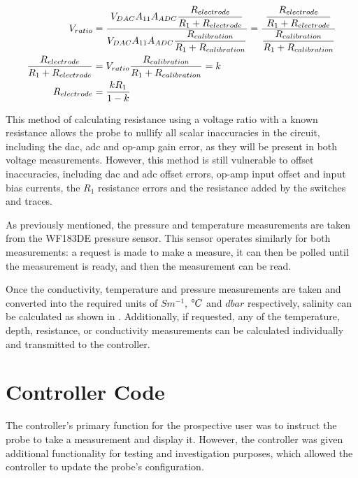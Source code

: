 \begin{align}
 V_{ratio} &= \frac{\displaystyle V_{DAC}A_{11}A_{ADC}\frac{\displaystyle R_{electrode}}{\displaystyle R_1 + R_{electrode}}}{\displaystyle V_{DAC}A_{11}A_{ADC}\frac{\displaystyle R_{calibration}}{\displaystyle R_1 + R_{calibration}}} = \frac{\displaystyle\frac{\displaystyle R_{electrode}}{\displaystyle R_1 + R_{electrode}}}{\displaystyle\frac{\displaystyle R_{calibration}}{\displaystyle R_1 + R_{calibration}}} \label{eqn:electrode-calib-resistance} \\
 \frac{\displaystyle R_{electrode}}{\displaystyle R_1 + R_{electrode}} &= V_{ratio} \frac{\displaystyle R_{calibration}}{\displaystyle R_1 + R_{calibration}} = k \label{eqn:electrode-calib-resistance-simplified} \\
 R_{electrode} &= \frac{\displaystyle kR_1}{\displaystyle1 - k} \label{eqn:electrode-calib-resistance-final}
\end{align}

This method of calculating resistance using a voltage ratio with a known resistance allows the probe to nullify all scalar inaccuracies in the circuit, including the \gls{dac}, \gls{adc} and op-amp gain error, as they will be present in both voltage measurements.
However, this method is still vulnerable to offset inaccuracies, including \gls{dac} and \gls{adc} offset errors, op-amp input offset and input bias currents, the $R_1$ resistance errors and the resistance added by the switches and traces.

As previously mentioned, the pressure and temperature measurements are taken from the WF183DE pressure sensor.
This sensor operates similarly for both measurements: a request is made to make a measure, it can then be polled until the measurement is ready, and then the measurement can be read.

Once the conductivity, temperature and pressure measurements are taken and converted into the required units of $Sm^{-1}$, $\degree C$ and $dbar$ respectively, salinity can be calculated as shown in .
Additionally, if requested, any of the temperature, depth, resistance, or conductivity measurements can be calculated individually and transmitted to the controller.

\section{Controller Code}

The controller's primary function for the prospective user was to instruct the probe to take a measurement and display it. However, the controller was given additional functionality for testing and investigation purposes, which allowed the controller to update the probe's configuration.

